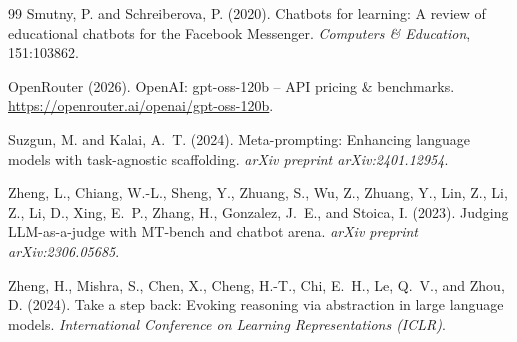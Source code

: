 \documentclass[11pt,a4paper]{article}
\begin{document}
\begin{thebibliography}{99}
Smutny, P. and Schreiberova, P. (2020).
\newblock Chatbots for learning: A review of educational chatbots for the Facebook
  Messenger.
\newblock \emph{Computers \& Education}, 151:103862.

OpenRouter (2026).
\newblock OpenAI: gpt-oss-120b -- API pricing \& benchmarks.
\newblock \url{https://openrouter.ai/openai/gpt-oss-120b}.

Suzgun, M. and Kalai, A.~T. (2024).
\newblock Meta-prompting: Enhancing language models with task-agnostic scaffolding.
\newblock \emph{arXiv preprint arXiv:2401.12954}.

Zheng, L., Chiang, W.-L., Sheng, Y., Zhuang, S., Wu, Z., Zhuang, Y., Lin, Z.,
  Li, Z., Li, D., Xing, E.~P., Zhang, H., Gonzalez, J.~E., and Stoica, I. (2023).
\newblock Judging LLM-as-a-judge with MT-bench and chatbot arena.
\newblock \emph{arXiv preprint arXiv:2306.05685}.

Zheng, H., Mishra, S., Chen, X., Cheng, H.-T., Chi, E.~H., Le, Q.~V., and Zhou, D. (2024).
\newblock Take a step back: Evoking reasoning via abstraction in large language models.
\newblock \emph{International Conference on Learning Representations (ICLR)}.

\end{thebibliography}
\end{document}
